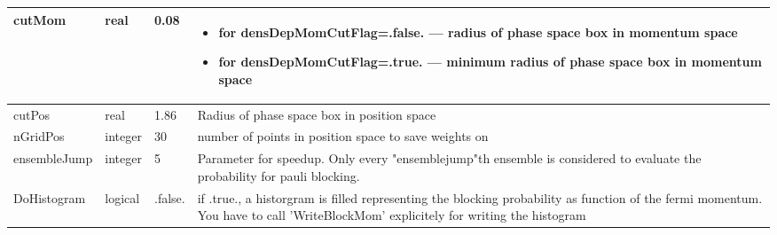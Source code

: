 \documentclass{article}
\begin{document}
\begin{longtable}{llll}
\midrule
cutMom & \begin{minipage}[t]{2cm}real\end{minipage} & \begin{minipage}[t]{2cm}0.08\end{minipage} & \begin{minipage}[t]{12cm}\begin{itemize}\leftmargin0em\itemindent0pt\item for densDepMomCutFlag=.false. ---   radius of phase space box in momentum space\item for densDepMomCutFlag=.true. ---   minimum radius of phase space box in momentum space\end{itemize}\end{minipage}\\*
\midrule
cutPos & \begin{minipage}[t]{2cm}real\end{minipage} & \begin{minipage}[t]{2cm}1.86\end{minipage} & \begin{minipage}[t]{12cm}Radius of phase space box in position space\end{minipage}\\*
\midrule
nGridPos & \begin{minipage}[t]{2cm}integer\end{minipage} & \begin{minipage}[t]{2cm}30\end{minipage} & \begin{minipage}[t]{12cm}number of points in position space to save weights on\end{minipage}\\*
\midrule
ensembleJump & \begin{minipage}[t]{2cm}integer\end{minipage} & \begin{minipage}[t]{2cm}5\end{minipage} & \begin{minipage}[t]{12cm}Parameter for speedup. Only every "ensemblejump"th ensemble is considered to evaluate the probability for pauli blocking.\end{minipage}\\*
\midrule
DoHistogram & \begin{minipage}[t]{2cm}logical\end{minipage} & \begin{minipage}[t]{2cm}.false.\end{minipage} & \begin{minipage}[t]{12cm}if .true., a historgram is filled representing the blocking probability as function of the fermi momentum. You have to call 'WriteBlockMom' explicitely for writing the histogram\end{minipage}\\*
\bottomrule
\end{longtable}
{ }
\end{document}

